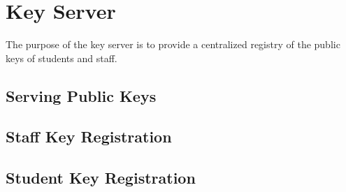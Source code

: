 
\section{Key Server}

The purpose of the key server is to provide a centralized registry of the
public keys of students and staff.

\subsection{Serving Public Keys}

\subsection{Staff Key Registration}

\subsection{Student Key Registration}
